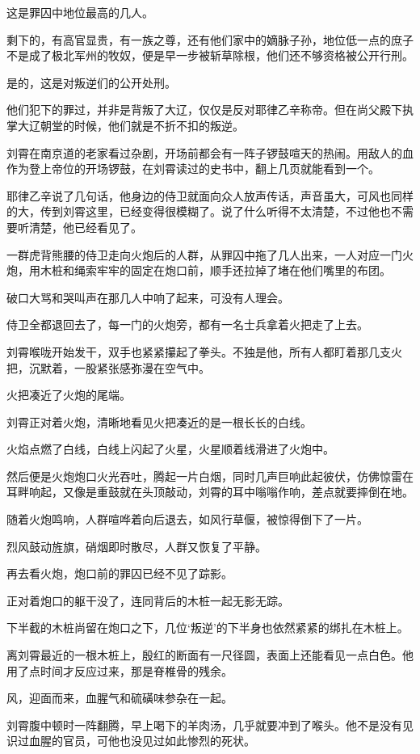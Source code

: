 这是罪囚中地位最高的几人。

剩下的，有高官显贵，有一族之尊，还有他们家中的嫡脉子孙，地位低一点的庶子不是成了极北军州的牧奴，便是早一步被斩草除根，他们还不够资格被公开行刑。

是的，这是对叛逆们的公开处刑。

他们犯下的罪过，并非是背叛了大辽，仅仅是反对耶律乙辛称帝。但在尚父殿下执掌大辽朝堂的时候，他们就是不折不扣的叛逆。

刘霄在南京道的老家看过杂剧，开场前都会有一阵子锣鼓喧天的热闹。用敌人的血作为登上帝位的开场锣鼓，在刘霄读过的史书中，翻上几页就能看到一个。

耶律乙辛说了几句话，他身边的侍卫就面向众人放声传话，声音虽大，可风也同样的大，传到刘霄这里，已经变得很模糊了。说了什么听得不太清楚，不过他也不需要听清楚，他已经看见了。

一群虎背熊腰的侍卫走向火炮后的人群，从罪囚中拖了几人出来，一人对应一门火炮，用木桩和绳索牢牢的固定在炮口前，顺手还拉掉了堵在他们嘴里的布团。

破口大骂和哭叫声在那几人中响了起来，可没有人理会。

侍卫全都退回去了，每一门的火炮旁，都有一名士兵拿着火把走了上去。

刘霄喉咙开始发干，双手也紧紧攥起了拳头。不独是他，所有人都盯着那几支火把，沉默着，一股紧张感弥漫在空气中。

火把凑近了火炮的尾端。

刘霄正对着火炮，清晰地看见火把凑近的是一根长长的白线。

火焰点燃了白线，白线上闪起了火星，火星顺着线滑进了火炮中。

然后便是火炮炮口火光吞吐，腾起一片白烟，同时几声巨响此起彼伏，仿佛惊雷在耳畔响起，又像是重鼓就在头顶敲动，刘霄的耳中嗡嗡作响，差点就要摔倒在地。

随着火炮鸣响，人群喧哗着向后退去，如风行草偃，被惊得倒下了一片。

烈风鼓动旌旗，硝烟即时散尽，人群又恢复了平静。

再去看火炮，炮口前的罪囚已经不见了踪影。

正对着炮口的躯干没了，连同背后的木桩一起无影无踪。

下半截的木桩尚留在炮口之下，几位‘叛逆’的下半身也依然紧紧的绑扎在木桩上。

离刘霄最近的一根木桩上，殷红的断面有一尺径圆，表面上还能看见一点白色。他用了点时间才反应过来，那是脊椎骨的残余。

风，迎面而来，血腥气和硫磺味参杂在一起。

刘霄腹中顿时一阵翻腾，早上喝下的羊肉汤，几乎就要冲到了喉头。他不是没有见识过血腥的官员，可他也没见过如此惨烈的死状。

